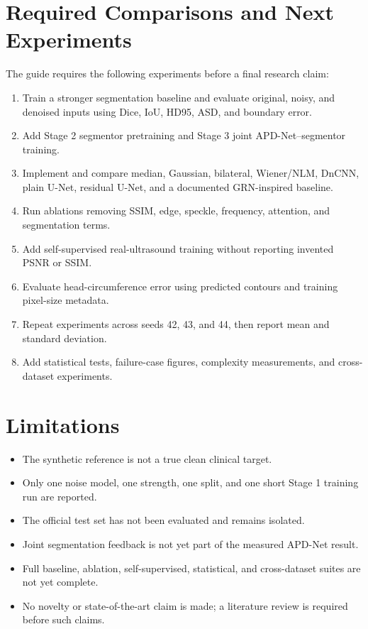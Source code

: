\documentclass[11pt,a4paper]{article}
\begin{document}
\section{Required Comparisons and Next Experiments}
The guide requires the following experiments before a final research claim:
\begin{enumerate}
	\item Train a stronger segmentation baseline and evaluate original, noisy, and denoised inputs using Dice, IoU, HD95, ASD, and boundary error.
	\item Add Stage 2 segmentor pretraining and Stage 3 joint APD-Net--segmentor training.
	\item Implement and compare median, Gaussian, bilateral, Wiener/NLM, DnCNN, plain U-Net, residual U-Net, and a documented GRN-inspired baseline.
	\item Run ablations removing SSIM, edge, speckle, frequency, attention, and segmentation terms.
	\item Add self-supervised real-ultrasound training without reporting invented PSNR or SSIM.
	\item Evaluate head-circumference error using predicted contours and training pixel-size metadata.
	\item Repeat experiments across seeds 42, 43, and 44, then report mean and standard deviation.
	\item Add statistical tests, failure-case figures, complexity measurements, and cross-dataset experiments.
\end{enumerate}

\section{Limitations}
\begin{itemize}
	\item The synthetic reference is not a true clean clinical target.
	\item Only one noise model, one strength, one split, and one short Stage 1 training run are reported.
	\item The official test set has not been evaluated and remains isolated.
	\item Joint segmentation feedback is not yet part of the measured APD-Net result.
	\item Full baseline, ablation, self-supervised, statistical, and cross-dataset suites are not yet complete.
	\item No novelty or state-of-the-art claim is made; a literature review is required before such claims.
\end{itemize}
\end{document}

